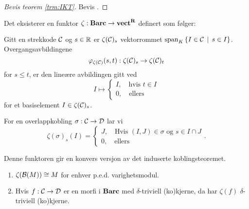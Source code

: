 \begin{proof}[Bevis teorem \ref{trm:IKT}]
  Bevis .
\end{proof}

\begin{definisjon}\label{def:zetafunktor}
  Det eksisterer en funktor $\zeta:\textnormal{\textbf{Barc}}\to\textnormal{\textbf{vect}}^{\textnormal{\textbf{{R}}}}$
  definert som følger:

  Gitt en strekkode $\mathcal{C}$ og $s\in\mathbb{R}$ er $\zeta(\mathcal{C})_s$
  vektorrommet $\text{span}_K\left\{I\in\mathcal{C}\,\mid\,s\in I\right\}$.
  Overgangsavbildingene
  \[\varphi_{\zeta(\mathcal{C})}(s,t):\zeta(\mathcal{C})_s\to\zeta(\mathcal{C})_t\]
  for $s\leq t$, er den lineære avbildingen gitt ved
  \[I \mapsto 
  \begin{cases}
    I,\quad \text{hvis $t\in I$}\\
    0,\quad \text{ellers}
  \end{cases}
  \]
  for et basiselement $I\in\zeta(\mathcal{C})_s$.

  For en overlappkobling $\sigma:\mathcal{C}\to\mathcal{D}$ lar vi
  \[\zeta(\sigma)_s(I) =
  \begin{cases}
    J,\quad \text{Hvis $(I,J)\in\sigma$ og $s\in I\cap
    J$}\\
    0,\quad\text{ellers}
  \end{cases}.\]
\end{definisjon}
Denne funktoren gir en konvers versjon av det induserte
koblingsteoremet.

\begin{proposisjon}\label{prop:KonvIKT}
  \begin{enumerate}
    \item $\zeta(\mathcal{B}(M))\cong M$ for enhver p.e.d.
      varighetsmodul.
    \item Hvis $f:\mathcal{C}\to\mathcal{D}$ er en morfi i $\textnormal{\textbf{Barc}}$ med
      $\delta$-triviell (ko)kjerne, da har $\zeta(f)$
      $\delta$-triviell (ko)kjerne.
  \end{enumerate}
\end{proposisjon}
